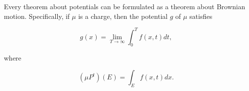 Every theorem about potentials can be formulated as a theorem about Brownian motion. Specifically, if $\mu$ is a charge, then the potential $g$ of $\mu$ satisfies

$$g(x) = \lim_{T \to \infty} \int_0^T f(x, t) dt,$$

where

$$(\mu P^t)(E) = \int_E f(x, t) dx.$$
